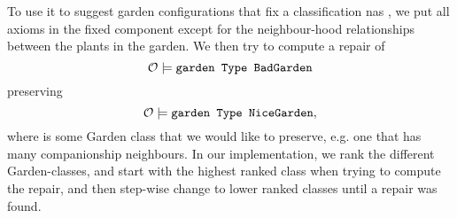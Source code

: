 To use it to suggest garden configurations
that fix a classification nas ,
we put all axioms in the fixed component except for the neighbour-hood relationships between
the plants in the garden. We then try to compute a repair of
$$\mathcal{O}\models \texttt{garden Type BadGarden}$$
preserving
$$\mathcal{O}\models \texttt{garden Type NiceGarden},$$
where  is some Garden class that we would like to preserve, e.g. one
that has many companionship neighbours. In our implementation, we rank the different
Garden-classes, and start with the highest ranked class when trying to compute the repair,
and then step-wise change to lower ranked classes until a repair was found.
